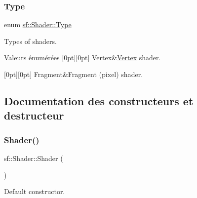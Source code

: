\subsubsection{\texorpdfstring{Type}{Type}}
{\footnotesize\ttfamily enum \hyperlink{classsf_1_1Shader_afaa1aa65e5de37b74d047da9def9f9b3}{sf\+::\+Shader\+::\+Type}}



Types of shaders. 

\begin{DoxyEnumFields}{Valeurs énumérées}
[0pt][0pt]{}\mbox{\label{classsf_1_1Shader_afaa1aa65e5de37b74d047da9def9f9b3a8718008f827eb32e29bbdd1791c62dce}} 
Vertex&\hyperlink{classsf_1_1Vertex}{Vertex} shader. \\
\hline

[0pt][0pt]{}\mbox{\label{classsf_1_1Shader_afaa1aa65e5de37b74d047da9def9f9b3ace6e88eec3a56b2e55ee3c8e64e9b89a}} 
Fragment&Fragment (pixel) shader. \\
\hline

\end{DoxyEnumFields}


\subsection{Documentation des constructeurs et destructeur}
\mbox{\label{classsf_1_1Shader_a1d7f28f26b4122959fcafec871c2c3c5}} 
\subsubsection{\texorpdfstring{Shader()}{Shader()}}
{\footnotesize\ttfamily sf\+::\+Shader\+::\+Shader (\begin{DoxyParamCaption}{ }\end{DoxyParamCaption})}



Default constructor. 


